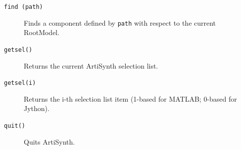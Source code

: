 \documentclass{article}
\begin{document}
\begin{description}
\item[{\tt find (path)} ] \mbox{}

Finds a component defined by {\tt path} with respect to the current RootModel.

\item[{\tt getsel()} ] \mbox{}

Returns the current ArtiSynth selection list.

\item[{\tt getsel(i)} ] \mbox{}

Returns the i-th selection list item (1-based for MATLAB; 0-based for Jython).

\item[{\tt quit()} ] \mbox{}

Quits ArtiSynth.

\end{description}
\end{document}
